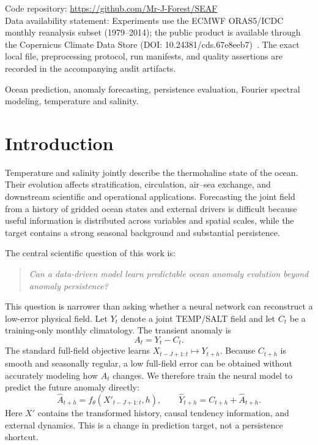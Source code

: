 \documentclass[conference]{IEEEtran}
\begin{document}
\renewcommand{\UrlFont}{\small\tt}
Code repository: \url{https://github.com/Mr-J-Forest/SEAF}\\
Data availability statement: Experiments use the ECMWF ORAS5/ICDC monthly reanalysis subset (1979--2014); the public product is available through the Copernicus Climate Data Store (DOI: 10.24381/cds.67e8eeb7)~\cite{copernicus2021oras5}. The exact local file, preprocessing protocol, run manifests, and quality assertions are recorded in the accompanying audit artifacts.

\begin{IEEEkeywords}
Ocean prediction, anomaly forecasting, persistence evaluation, Fourier spectral modeling, temperature and salinity.
\end{IEEEkeywords}

\section{Introduction}

Temperature and salinity jointly describe the thermohaline state of the ocean. Their evolution affects stratification, circulation, air--sea exchange, and downstream scientific and operational applications. Forecasting the joint field from a history of gridded ocean states and external drivers is difficult because useful information is distributed across variables and spatial scales, while the target contains a strong seasonal background and substantial persistence.

The central scientific question of this work is:
\begin{quote}
\emph{Can a data-driven model learn predictable ocean anomaly evolution beyond anomaly persistence?}
\end{quote}
This question is narrower than asking whether a neural network can reconstruct a low-error physical field. Let $Y_t$ denote a joint TEMP/SALT field and let $C_t$ be a training-only monthly climatology. The transient anomaly is
\begin{equation}
A_t=Y_t-C_t.
\label{eq:intro_anomaly}
\end{equation}
The standard full-field objective learns $X_{t-J+1:t}\mapsto Y_{t+h}$. Because $C_{t+h}$ is smooth and seasonally regular, a low full-field error can be obtained without accurately modeling how $A_t$ changes. We therefore train the neural model to predict the future anomaly directly:
\begin{equation}
\widehat{A}_{t+h}=f_{\theta}(X'_{t-J+1:t},h),\qquad
\widehat{Y}_{t+h}=C_{t+h}+\widehat{A}_{t+h}.
\label{eq:intro_direct}
\end{equation}
Here $X'$ contains the transformed history, causal tendency information, and external dynamics. This is a change in prediction target, not a persistence shortcut.
\end{document}
